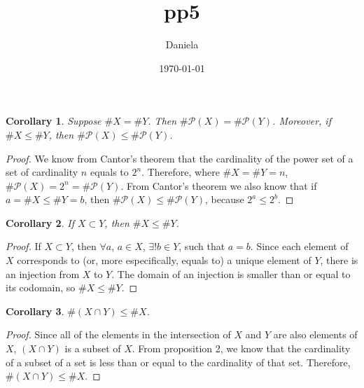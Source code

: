 \documentclass[11pt,reqno,oneside,a4paper]{article}
\title{pp5}
\author{Daniela}
\date{\today}
\newtheorem{corollary}{Corollary}[theorem]
\begin{document}
\maketitle

\begin{corollary} \label{proposition:PowerSetsPreserveEquinumerosity}
	Suppose $\# X=\# Y$.
	Then $\# \mathcal{P}(X)=\# \mathcal{P}(Y)$.
	Moreover, if $\# X\leq\# Y$, then $\# \mathcal{P}(X)\leq\# \mathcal{P}(Y)$.
\end{corollary}

\begin{proof}
We know from Cantor's theorem that the cardinality of the power set of a set of cardinality $n$ equals to $2^n$. Therefore, where $\# X=\# Y = n $, $\# \mathcal{P}(X)= 2^n = \# \mathcal{P}(Y)$. From Cantor's theorem we also know that  if $a = \# X\leq\# Y = b$, then $\#\mathcal{P}(X)\leq\# \mathcal{P}(Y)$, because $2^a \leq 2^b$.
\end{proof}

\begin{corollary} \label{prop:SubsetCardinality}
	If $X\subset Y$, then $\# X\leq \# Y$.
\end{corollary}

\begin{proof}
If $X\subset Y$, then $\forall a$, $a \in X$, $	\exists! b \in Y$, such that $a=b$. Since each element of $X$ corresponds to (or, more especifically, equals to) a unique element of $Y$, there is an injection from $X$ to $Y$. The domain of an injection is smaller than or equal to its codomain, so  $\# X\leq \# Y$.
\end{proof}

\begin{corollary} \label{cor:IntersectionCardinality}
	$\# (X\cap Y) \leq \# X$.
\end{corollary}

\begin{proof}
Since all of the elements in the intersection of $X$ and $Y$ are also elements of $X$, $(X \cap Y)$ is a subset of $X$. From proposition 2, we know that the cardinality of a subset of a set is less than or equal to the cardinality of that set. Therefore, $\#(X\cap Y) \leq \#X$.
\end{proof}
\end{document}
